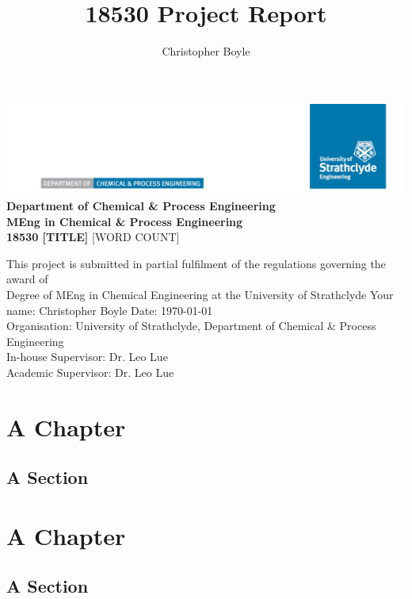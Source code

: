 \documentclass[10pt]{report}
\title{18530 Project Report}
\author{Christopher Boyle}
\begin{document}
\begin{titlepage}
\includegraphics[scale=1]{images/titleheader.png}
\centering
\vfill
{\bfseries\Large
Department of Chemical \& Process Engineering\\
\vskip1cm
MEng in Chemical \& Process Engineering\\
18530
\vskip2cm
[TITLE]
}
\vskip2cm
[WORD COUNT]
\vskip1cm
\begin{flushleft}
\hskip3cm
This project is submitted in partial fulfilment of the regulations governing the award of \\
\hskip3cm
Degree of MEng in Chemical Engineering at the University of Strathclyde
\vfill
\hskip3cm
Your name: Christopher Boyle\hskip3cm
Date: \today\\
\vskip1cm
\hskip3cm
Organisation: University of Strathclyde, Department of Chemical \& Process Engineering\\
\hskip3cm
In-house Supervisor: Dr. Leo Lue\\
\hskip3cm
Academic Supervisor: Dr. Leo Lue\\
\end{flushleft}
\vfill
\end{titlepage}


\tableofcontents

\chapter{A Chapter}
\blindtext
\section{A Section}
\blindtext
\blindtext
\blindtext
\blindtext

\chapter{A Chapter}
\blindtext
\section{A Section}
\blindtext
\newline\newline
\blindtext
\blindtext
\blindtext
\newline\newline
\blindtext
\blindtext
\blindtext
\blindtext
\newline\newline
\blindtext
\blindtext
\blindtext
\newline\newline
\blindtext
\end{document}
